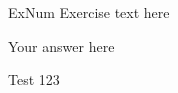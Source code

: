 \documentclass{rutgers_hw}
\author{Firstname Lastname} %
\date{\today} %
\begin{document}
\maketitle



\begin{exercise}{ExNum}
Exercise text here
\end{exercise}
\begin{solution}
Your answer here
\end{solution}

\newpage

\begin{exercise}{2}
  Test 123
\end{exercise}
\end{document}
